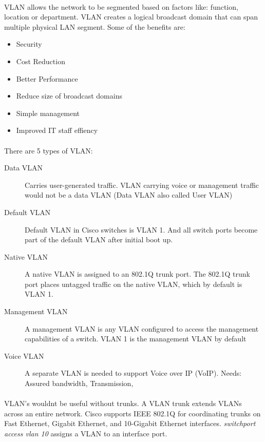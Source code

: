 \documentclass[10pt,landscape]{article}
\begin{document}
\begin{multicols}{3}
\paragraph{}
VLAN allows the network to be segmented based on factors like: function, location or department. VLAN creates a logical broadcast domain that can span multiple physical LAN segment.
Some of the benefits are:
\begin{itemize}
	\item Security
	\item Cost Reduction
	\item Better Performance
	\item Reduce size of broadcast domains
	\item Simple management
	\item Improved IT staff effiency
\end{itemize}
\paragraph{}
There are 5 types of VLAN:
\begin{description}
	\item[Data VLAN] Carries user-generated traffic. VLAN carrying voice or management traffic would not be a data VLAN (Data VLAN also called User VLAN)
	\item[Default VLAN] Default VLAN in Cisco switches is VLAN 1. And all switch ports become part of the default VLAN after initial boot up.
	\item[Native VLAN] A native VLAN is assigned to an 802.1Q trunk port. The 802.1Q trunk port places untagged traffic on the native VLAN, which by default is VLAN 1.
	\item[Management VLAN] A management VLAN is any VLAN configured to access the management capabilities of a switch. VLAN 1 is the management VLAN by default
	\item[Voice VLAN] A separate VLAN is needed to support Voice over IP (VoIP). Needs: Assured bandwidth, Transmission,
\end{description}
\paragraph{}
VLAN's wouldnt be useful without trunks. A VLAN trunk extends VLANs across an entire network. Cisco supports IEEE 802.1Q for coordinating trunks on Fast Ethernet, Gigabit Ethernet, and 10-Gigabit Ethernet interfaces.
\textit{switchport access vlan 10 } assigns a VLAN to an interface port.


\end{multicols}
\end{document}
